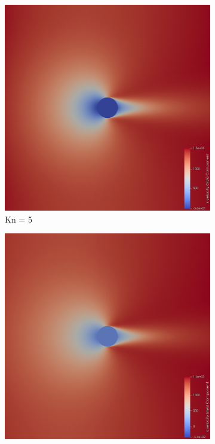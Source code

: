 \begin{figure}
    \centering
    \begin{subfigure}{0.32\textwidth}
        \centering
        \includegraphics[width=\textwidth]{Images/4. Results/Circle Kn/pv/Kn5.png}
        \caption{Kn = 5}
    \end{subfigure}
    \hfill
    \begin{subfigure}{0.32\textwidth}
        \centering
        \includegraphics[width=\textwidth]{Images/4. Results/Circle Kn/pv/Kn10.png}

\end{subfigure}
\end{figure}
